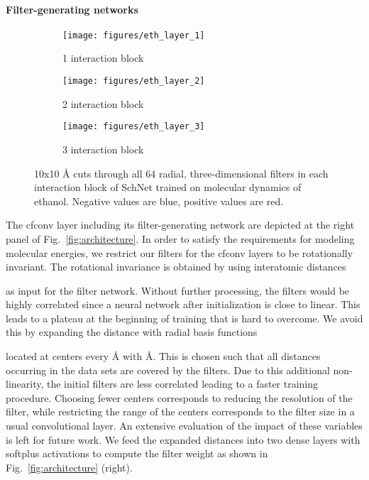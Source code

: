 \documentclass{article}
\begin{document}
\paragraph{Filter-generating networks}
\begin{figure}
\centering
\begin{subfigure}[b]{0.28\textwidth}
  \texttt{[image: figures/eth\_layer\_1]}
  \caption{1 interaction block}
  \label{fig:layer1}
\end{subfigure}
\quad
\begin{subfigure}[b]{0.28\textwidth}
  \texttt{[image: figures/eth\_layer\_2]}
  \caption{2 interaction block}
  \label{fig:layer1}
\end{subfigure}
\quad
\begin{subfigure}[b]{0.28\textwidth}
  \texttt{[image: figures/eth\_layer\_3]}
  \caption{3 interaction block}
  \label{fig:layer1}
\end{subfigure}
\caption{10x10 {\AA} cuts through all 64 radial, three-dimensional filters in each interaction block of
SchNet trained on molecular dynamics of ethanol. Negative values are blue, positive values are red.}\label{fig:filters}
\end{figure}
The cfconv layer including its filter-generating network are depicted at the right panel of Fig.~\ref{fig:architecture}.
In order to satisfy the requirements for modeling molecular energies, we restrict our filters for the cfconv layers to be rotationally invariant.
The rotational invariance is obtained by using interatomic distances

as input for the filter network.
Without further processing, the filters would be highly correlated since a neural network after initialization is close to linear.
This leads to a plateau at the beginning of training that is hard to overcome.
We avoid this by expanding the distance with radial basis functions 

located at centers  every {\AA} with {\AA}.
This is chosen such that all distances occurring in the data sets are covered by the filters.
Due to this additional non-linearity, the initial filters are less correlated leading to a faster training procedure.
Choosing fewer centers corresponds to reducing the resolution of the filter, while restricting the range of the centers corresponds to the filter size in a usual convolutional layer.
An extensive evaluation of the impact of these variables is left for future work.
We feed the expanded distances 
into two dense layers with softplus activations to compute the filter weight  as shown in Fig.~\ref{fig:architecture} (right).
\end{document}
